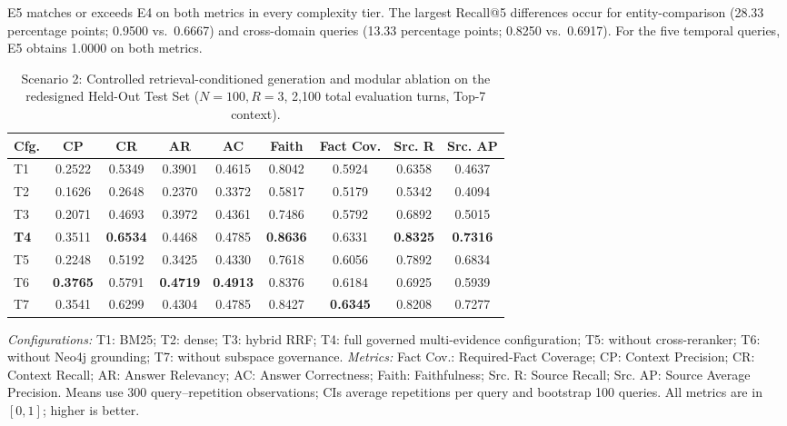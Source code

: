 E5 matches or exceeds E4 on both metrics in every complexity tier. The largest Recall@5 differences occur for entity-comparison (28.33 percentage points; 0.9500 vs.\ 0.6667) and cross-domain queries (13.33 percentage points; 0.8250 vs.\ 0.6917). For the five temporal queries, E5 obtains 1.0000 on both metrics.

\begin{table}[!htbp]
\centering
\caption{Scenario 2: Controlled retrieval-conditioned generation and modular ablation on the redesigned Held-Out Test Set ($N=100, R=3$, 2,100 total evaluation turns, Top-7 context).}
\label{tab:e2e_evaluation}
\small
\setlength{\tabcolsep}{2.4pt}
\begin{tabular}{lcccccccc}
\toprule
\textbf{Cfg.} & \textbf{CP} & \textbf{CR} & \textbf{AR} & \textbf{AC} & \textbf{Faith} & \textbf{Fact Cov.} & \textbf{Src. R} & \textbf{Src. AP} \\
\midrule
T1 & 0.2522 & 0.5349 & 0.3901 & 0.4615 & 0.8042 & 0.5924 & 0.6358 & 0.4637 \\
T2 & 0.1626 & 0.2648 & 0.2370 & 0.3372 & 0.5817 & 0.5179 & 0.5342 & 0.4094 \\
T3 & 0.2071 & 0.4693 & 0.3972 & 0.4361 & 0.7486 & 0.5792 & 0.6892 & 0.5015 \\
\textbf{T4} & 0.3511 & \textbf{0.6534} & 0.4468 & 0.4785 & \textbf{0.8636} & 0.6331 & \textbf{0.8325} & \textbf{0.7316} \\
T5 & 0.2248 & 0.5192 & 0.3425 & 0.4330 & 0.7618 & 0.6056 & 0.7892 & 0.6834 \\
T6 & \textbf{0.3765} & 0.5791 & \textbf{0.4719} & \textbf{0.4913} & 0.8376 & 0.6184 & 0.6925 & 0.5939 \\
T7 & 0.3541 & 0.6299 & 0.4304 & 0.4785 & 0.8427 & \textbf{0.6345} & 0.8208 & 0.7277 \\
\bottomrule
\end{tabular}
\medskip
\parbox{\columnwidth}{\footnotesize\emph{Configurations:} T1: BM25; T2: dense; T3: hybrid RRF; T4: full governed multi-evidence configuration; T5: without cross-reranker; T6: without Neo4j grounding; T7: without subspace governance. \emph{Metrics:} Fact Cov.: Required-Fact Coverage; CP: Context Precision; CR: Context Recall; AR: Answer Relevancy; AC: Answer Correctness; Faith: Faithfulness; Src. R: Source Recall; Src. AP: Source Average Precision. Means use 300 query--repetition observations; CIs average repetitions per query and bootstrap 100 queries. All metrics are in $[0,1]$; higher is better.}
\end{table}

